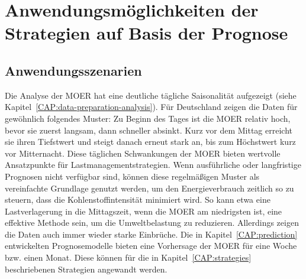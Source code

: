 \chapter{Anwendungsmöglichkeiten der Strategien auf Basis der Prognose}\label{CAP:prediction-application}
\section{Anwendungsszenarien}\label{CAP:scenarios}
Die Analyse der \ac{MOER} hat eine deutliche tägliche Saisonalität aufgezeigt (siehe Kapitel~\ref{CAP:data-preparation-analysis}).
Für Deutschland zeigen die Daten für gewöhnlich folgendes Muster:
Zu Beginn des Tages ist die \ac{MOER} relativ hoch, bevor sie zuerst langsam, dann schneller absinkt.
Kurz vor dem Mittag erreicht sie ihren Tiefstwert und steigt danach erneut stark an, bis zum Höchstwert kurz vor Mitternacht.
Diese täglichen Schwankungen der \ac{MOER} bieten wertvolle Ansatzpunkte für Lastmanagementstrategien.
Wenn ausführliche oder langfristige Prognosen nicht verfügbar sind, können diese regelmäßigen Muster als vereinfachte Grundlage genutzt werden, um den Energieverbrauch zeitlich so zu steuern, dass die Kohlenstoffintensität minimiert wird.
So kann etwa eine Lastverlagerung in die Mittagszeit, wenn die \ac{MOER} am niedrigsten ist, eine effektive Methode sein, um die Umweltbelastung zu reduzieren.
Allerdings zeigen die Daten auch immer wieder starke Einbrüche.
Die in Kapitel~\ref{CAP:prediction} entwickelten Prognosemodelle bieten eine Vorhersage der \ac{MOER} für eine Woche bzw. einen Monat.
Diese können für die in Kapitel~\ref{CAP:strategies} beschriebenen Strategien angewandt werden.

